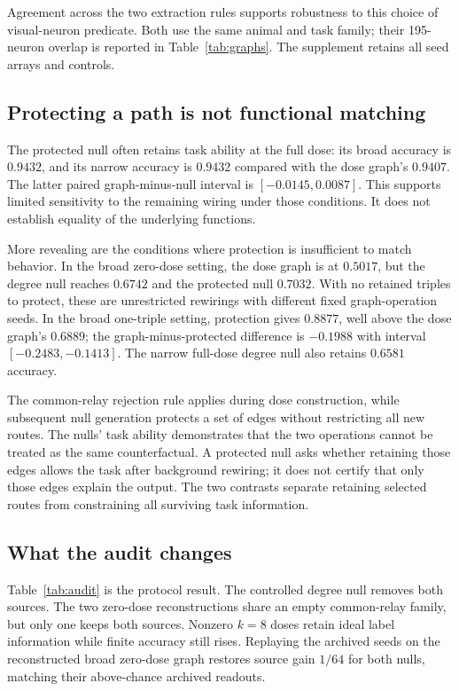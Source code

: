 Agreement across the two extraction rules supports robustness to this
choice of visual-neuron predicate. Both use the same animal and task
family; their 195-neuron overlap is reported in Table~\ref{tab:graphs}.
The supplement retains all seed arrays and controls.

\subsection{Protecting a path is not functional matching}
\label{sec:exceptions}

The protected null often retains task ability at the full dose: its broad
accuracy is $0.9432$, and its narrow accuracy is $0.9432$ compared with
the dose graph's $0.9407$. The latter paired graph-minus-null interval is
$[-0.0145,0.0087]$. This supports limited sensitivity to the remaining
wiring under those conditions. It does not establish equality of the
underlying functions.

More revealing are the conditions where protection is insufficient to
match behavior. In the broad zero-dose setting, the dose graph is at
$0.5017$, but the degree null reaches $0.6742$ and the protected null
$0.7032$. With no retained triples to protect, these are unrestricted
rewirings with different fixed graph-operation seeds. In the broad
one-triple setting, protection gives $0.8877$, well above the dose graph's
$0.6889$; the graph-minus-protected difference is $-0.1988$ with interval
$[-0.2483,-0.1413]$. The narrow full-dose degree null also retains
$0.6581$ accuracy.

The common-relay rejection rule
applies during dose construction, while subsequent null generation
protects a set of edges without restricting all new routes. The nulls'
task ability demonstrates that the two operations cannot be treated as
the same counterfactual. A protected null asks whether retaining those
edges allows the task after background rewiring; it does not certify
that only those edges explain the output. The two contrasts separate retaining selected routes from constraining
all surviving task information.

\subsection{What the audit changes}
\label{sec:audit-changes}

Table~\ref{tab:audit} is the protocol result. The controlled degree null removes both sources. The two zero-dose reconstructions share an empty common-relay family, but only one keeps both sources. Nonzero $k=8$ doses retain ideal label information while finite accuracy still rises. Replaying the archived seeds on the reconstructed broad zero-dose graph restores source gain $1/64$ for both nulls, matching their above-chance archived readouts.

